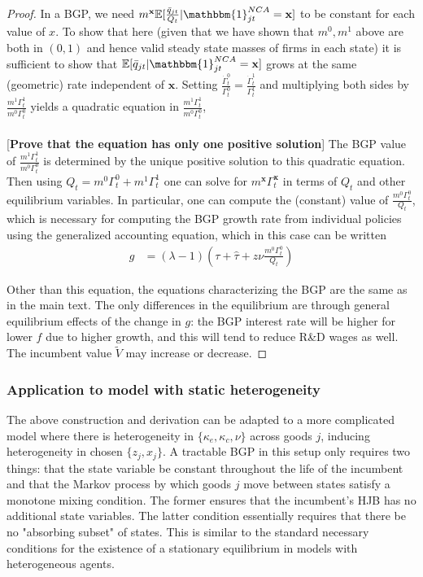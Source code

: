 \documentclass[11pt,english]{article}
\begin{document}
\begin{proof}
	In a BGP, we need $m^{\mathbf{x}} \mathbb{E} [\frac{\bar{q}_{jt}}{Q_t} | \mathbbm{1}^{NCA}_{jt} = \mathbf{x}]$ to be constant for each value of $x$. To show that here (given that we have shown that $m^0,m^1$ above are both in $(0,1)$ and hence valid steady state masses of firms in each state) it is sufficient to show that $\mathbb{E}[ \bar{q}_{jt} | \mathbbm{1}^{NCA}_{jt} = \mathbf{x}]$ grows at the same (geometric) rate independent of $\mathbf{x}$. Setting $\frac{\dot{\Gamma}_t^0}{\Gamma_t^0} = \frac{\dot{\Gamma}_t^1}{\Gamma_t^1}$ and multiplying both sides by $\frac{m^1 \Gamma_t^1}{m^0 \Gamma_t^0}$ yields a quadratic equation in $\frac{m^1 \Gamma_t^1}{m^0 \Gamma_t^0}$,
	\begin{align}
		[in progress]
	\end{align}
	
	[\textbf{Prove that the equation has only one positive solution}] The BGP value of $\frac{m^1 \Gamma_t^1}{m^0 \Gamma_t^0}$ is determined by the unique positive solution to this quadratic equation. Then using $Q_t = m^0 \Gamma_t^0 + m^1 \Gamma_t^1$ one can solve for $m^{\mathbf{x}} \Gamma_t^{\mathbf{x}}$ in terms of $Q_t$ and other equilibrium variables. In particular, one can compute the (constant) value of $\frac{m^0 \Gamma_t^0}{Q_t}$, which is necessary for computing the BGP growth rate from individual policies using the generalized accounting equation, which in this case can be written 
	\begin{align}
	g &= (\lambda - 1) (\tau + \hat{\tau} + z \nu  \frac{m^0 \Gamma^0_t}{Q_t} )
	\end{align}
	
	Other than this equation, the equations characterizing the BGP are the same as in the main text. The only differences in the equilibrium are through general equilibrium effects of the change in $g$: the BGP interest rate will be higher for lower $f$ due to higher growth, and this will tend to reduce R\&D wages as well. The incumbent value $\tilde{V}$ may increase or decrease.
\end{proof}

\subsubsection{Application to model with static heterogeneity}

The above construction and derivation can be adapted to a more complicated model where there is heterogeneity in $\{\kappa_e, \kappa_c, \nu\}$ across goods $j$, inducing heterogeneity in chosen $\{z_j,x_j\}$. A tractable BGP in this setup only requires two things: that the state variable be constant throughout the life of the incumbent and that the Markov process by which goods $j$ move between states satisfy a monotone mixing condition. The former ensures that the incumbent's HJB has no additional state variables. The latter condition essentially requires that there be no "absorbing subset" of states. This is similar to the standard necessary conditions for the existence of a stationary equilibrium in models with heterogeneous agents.
\end{document}
